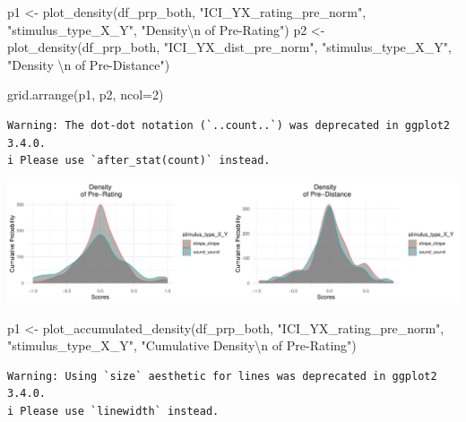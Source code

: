 \documentclass[
  letterpaper,
  DIV=11,
  numbers=noendperiod]{scrartcl}
\newenvironment{Shaded}{\begin{snugshade}}{\end{snugshade}}
\newcommand{\AttributeTok}[1]{\textcolor[rgb]{0.40,0.45,0.13}{#1}}
\newcommand{\DecValTok}[1]{\textcolor[rgb]{0.68,0.00,0.00}{#1}}
\newcommand{\FunctionTok}[1]{\textcolor[rgb]{0.28,0.35,0.67}{#1}}
\newcommand{\NormalTok}[1]{\textcolor[rgb]{0.00,0.23,0.31}{#1}}
\newcommand{\OtherTok}[1]{\textcolor[rgb]{0.00,0.23,0.31}{#1}}
\newcommand{\SpecialCharTok}[1]{\textcolor[rgb]{0.37,0.37,0.37}{#1}}
\newcommand{\StringTok}[1]{\textcolor[rgb]{0.13,0.47,0.30}{#1}}
\begin{document}
\begin{Shaded}
\begin{Highlighting}[]
\NormalTok{p1 }\OtherTok{\textless{}{-}} \FunctionTok{plot\_density}\NormalTok{(df\_prp\_both, }\StringTok{"ICI\_YX\_rating\_pre\_norm"}\NormalTok{, }\StringTok{"stimulus\_type\_X\_Y"}\NormalTok{, }\StringTok{"Density}\SpecialCharTok{\textbackslash{}n}\StringTok{ of Pre{-}Rating"}\NormalTok{)}
\NormalTok{p2 }\OtherTok{\textless{}{-}} \FunctionTok{plot\_density}\NormalTok{(df\_prp\_both, }\StringTok{"ICI\_YX\_dist\_pre\_norm"}\NormalTok{, }\StringTok{"stimulus\_type\_X\_Y"}\NormalTok{, }\StringTok{"Density }\SpecialCharTok{\textbackslash{}n}\StringTok{ of Pre{-}Distance"}\NormalTok{)}

\FunctionTok{grid.arrange}\NormalTok{(p1, p2, }\AttributeTok{ncol=}\DecValTok{2}\NormalTok{)}
\end{Highlighting}
\end{Shaded}

\begin{verbatim}
Warning: The dot-dot notation (`..count..`) was deprecated in ggplot2 3.4.0.
i Please use `after_stat(count)` instead.
\end{verbatim}

\includegraphics{index_files/figure-pdf/unnamed-chunk-23-1.pdf}

\begin{Shaded}
\begin{Highlighting}[]
\NormalTok{p1 }\OtherTok{\textless{}{-}} \FunctionTok{plot\_accumulated\_density}\NormalTok{(df\_prp\_both, }\StringTok{"ICI\_YX\_rating\_pre\_norm"}\NormalTok{, }\StringTok{"stimulus\_type\_X\_Y"}\NormalTok{, }\StringTok{"Cumulative Density}\SpecialCharTok{\textbackslash{}n}\StringTok{ of Pre{-}Rating"}\NormalTok{)}
\end{Highlighting}
\end{Shaded}

\begin{verbatim}
Warning: Using `size` aesthetic for lines was deprecated in ggplot2 3.4.0.
i Please use `linewidth` instead.
\end{verbatim}
\end{document}
